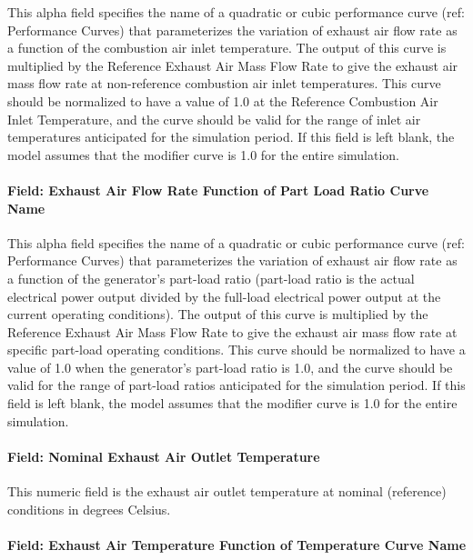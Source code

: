 This alpha field specifies the name of a quadratic or cubic performance curve (ref: Performance Curves) that parameterizes the variation of exhaust air flow rate as a function of the combustion air inlet temperature. The output of this curve is multiplied by the Reference Exhaust Air Mass Flow Rate to give the exhaust air mass flow rate at non-reference combustion air inlet temperatures. This curve should be normalized to have a value of 1.0 at the Reference Combustion Air Inlet Temperature, and the curve should be valid for the range of inlet air temperatures anticipated for the simulation period. If this field is left blank, the model assumes that the modifier curve is 1.0 for the entire simulation.

\paragraph{Field: Exhaust Air Flow Rate Function of Part Load Ratio Curve Name}\label{field-exhaust-air-flow-rate-function-of-part-load-ratio-curve-name}

This alpha field specifies the name of a quadratic or cubic performance curve (ref: Performance Curves) that parameterizes the variation of exhaust air flow rate as a function of the generator's part-load ratio (part-load ratio is the actual electrical power output divided by the full-load electrical power output at the current operating conditions). The output of this curve is multiplied by the Reference Exhaust Air Mass Flow Rate to give the exhaust air mass flow rate at specific part-load operating conditions. This curve should be normalized to have a value of 1.0 when the generator's part-load ratio is 1.0, and the curve should be valid for the range of part-load ratios anticipated for the simulation period. If this field is left blank, the model assumes that the modifier curve is 1.0 for the entire simulation.

\paragraph{Field: Nominal Exhaust Air Outlet Temperature}\label{field-nominal-exhaust-air-outlet-temperature}

This numeric field is the exhaust air outlet temperature at nominal (reference) conditions in degrees Celsius.

\paragraph{Field: Exhaust Air Temperature Function of Temperature Curve Name}\label{field-exhaust-air-temperature-function-of-temperature-curve-name}

